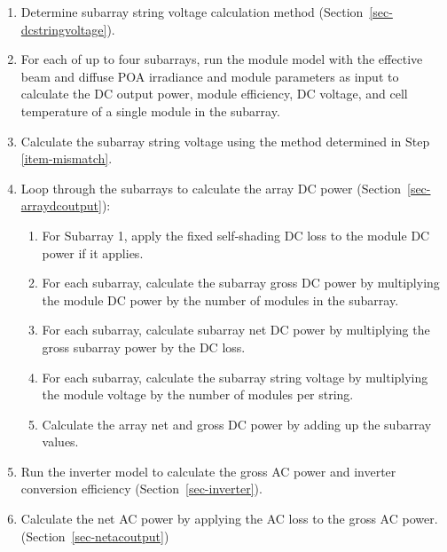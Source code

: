 \documentclass[12pt,letterpaper]{article}
\begin{document}
\begin{enumerate}
\item{Determine subarray string voltage calculation method (Section~\ref{sec-dcstringvoltage}).} \label{item-mismatch} %

\item{For each of up to four subarrays, run the module model with the effective beam and diffuse POA irradiance and module parameters as input to calculate the DC output power, module efficiency, DC voltage, and cell temperature of a single module in the subarray.} %

\item{Calculate the subarray string voltage using the method determined in Step \ref{item-mismatch}.} %

\item{Loop through the subarrays to calculate the array DC power (Section~\ref{sec-arraydcoutput}):} %

  \begin{enumerate}

  \item{For Subarray 1, apply the fixed self-shading DC loss to the module DC power if it applies.} %

  \item{For each subarray, calculate the subarray gross DC power by multiplying the module DC power by the number of modules in the subarray.} %

  \item{For each subarray, calculate subarray net DC power by multiplying the gross subarray power by the DC loss.} %

  \item{For each subarray, calculate the subarray string voltage by multiplying the module voltage by the number of modules per string.} %

  \item{Calculate the array net and gross DC power by adding up the subarray values.}

  \end{enumerate}

\item{Run the inverter model to calculate the gross AC power and inverter conversion efficiency (Section~\ref{sec-inverter}).} %


\item{Calculate the net AC power by applying the AC loss to the gross AC power. (Section~\ref{sec-netacoutput})} %

\end{enumerate}
\end{document}

